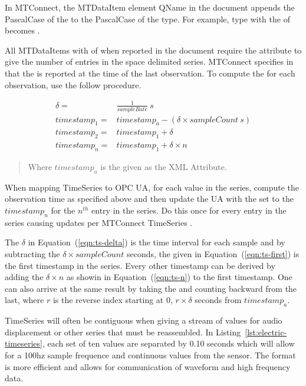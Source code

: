 In MTConnect, the \gls{MTDataItem} element \gls{QName} in the  document appends the \gls{PascalCase} of the  to the \gls{PascalCase} of the \gls{type}. For example, \gls{type}  with the  of  becomes . 

All \glspl{MTDataItem} with  of  when reported in the  document require the attribute  to give the number of entries in the space delimited series. MTConnect specifies in \cite{MTCPart3} that the  is reported at the time of the last observation. To compute the  for each observation, use the follow procedure.

\begin{align}
  \delta =& \frac{1}{sampleRate}\ s \label{eqn:ts-delta} \\
  timestamp_1 =& timestamp_a - (\delta \times sampleCount\ s) \label{eqn:ts-first} \\
  timestamp_2 =& timestamp_1 + \delta  \label{eqn:ts-second} \\
  timestamp_n =& timestamp_1 + \delta \times n \label{eqn:ts-n}
\end{align}
\begin{quote}
  Where $timestamp_a$ is the  given as the XML Attribute.
\end{quote}

When mapping \gls{TimeSeries} to OPC UA, for each value in the series, compute the observation time as specified above and then update the UA  with the  set to the $timestamp_n$ for the $n^{th}$ entry in the series. Do this once for every entry in the series causing  updates per MTConnect \gls{TimeSeries} .

The $\delta$ in Equation~(\ref{eqn:ts-delta}) is the time interval for each sample and by subtracting the $\delta \times sampleCount$ seconds, the given in Equation~(\ref{eqn:ts-first}) is the first timestamp in the series. Every other timestamp can be derived by adding the $\delta \times n$ as showin in Equation~(\ref{eqn:ts-n}) to the first timestamp. One can also arrive at the same result by taking the  and counting backward from the last, where $r$ is the reverse index starting at 0, $r \times \delta$ seconds from $timestamp_a$.

\gls{TimeSeries}  will often be contiguous when giving a stream of values for audio displacement or other series that must be reassembled. In Listing~\ref{lst:electric-timeseries}, each set of ten values are separated by 0.10 seconds which will allow for a 100hz sample frequence and continuous values from the sensor. The format is more efficient and allows for communication of waveform and high frequency data.


